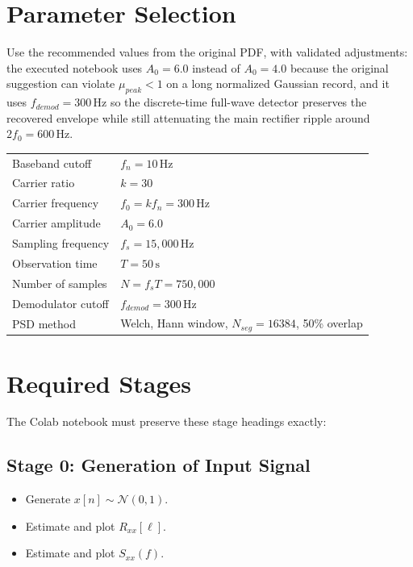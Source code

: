 \documentclass[11pt,a4paper]{article}
\begin{document}
\section*{Parameter Selection}
Use the recommended values from the original PDF, with validated adjustments:
the executed notebook uses $A_0 = 6.0$ instead of $A_0 = 4.0$ because the
original suggestion can violate $\mu_{peak} < 1$ on a long normalized Gaussian
record, and it uses $f_{demod} = 300\,\text{Hz}$ so the discrete-time full-wave
detector preserves the recovered envelope while still attenuating the main
rectifier ripple around $2f_0 = 600\,\text{Hz}$.
\begin{center}
\begin{tabular}{>{\raggedright\arraybackslash}p{5.3cm} p{6.5cm}}
\toprule
Baseband cutoff & $f_n = 10\,\text{Hz}$ \\
Carrier ratio & $k = 30$ \\
Carrier frequency & $f_0 = k f_n = 300\,\text{Hz}$ \\
Carrier amplitude & $A_0 = 6.0$ \\
Sampling frequency & $f_s = 15{,}000\,\text{Hz}$ \\
Observation time & $T = 50\,\text{s}$ \\
Number of samples & $N = f_s T = 750{,}000$ \\
Demodulator cutoff & $f_{demod} = 300\,\text{Hz}$ \\
PSD method & Welch, Hann window, $N_{seg}=16384$, 50\% overlap \\
\bottomrule
\end{tabular}
\end{center}

\section*{Required Stages}
The Colab notebook must preserve these stage headings exactly:

\subsection*{Stage 0: Generation of Input Signal}
\begin{itemize}[leftmargin=1.5em]
  \item Generate $x[n] \sim \mathcal{N}(0,1)$.
  \item Estimate and plot $R_{xx}[\ell]$.
  \item Estimate and plot $S_{xx}(f)$.
\end{itemize}
\end{document}

